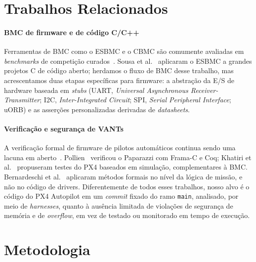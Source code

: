 \documentclass[conference]{IEEEtran}
\begin{document}
\section{Trabalhos Relacionados}
\label{sec:related}

\paragraph{BMC de firmware e de código C/C++}
Ferramentas de BMC como o ESBMC e o CBMC são comumente avaliadas em
\textit{benchmarks} de competição curados~\cite{Beyer2022}.
Sousa et al.~\cite{Sousa2026} aplicaram o ESBMC a grandes projetos C
de código aberto; herdamos o fluxo de BMC desse trabalho, mas
acrescentamos duas etapas específicas para firmware: a abstração da
E/S de hardware baseada em \textit{stubs} (UART, \textit{Universal
Asynchronous Receiver-Transmitter}; I2C, \textit{Inter-Integrated
Circuit}; SPI, \textit{Serial Peripheral Interface}; uORB) e as
asserções personalizadas derivadas de \textit{datasheets}.

\paragraph{Verificação e segurança de VANTs}
A verificação formal de firmware de pilotos automáticos continua
sendo uma lacuna em aberto~\cite{Luckcuck2019}.
Pollien~\cite{Pollien2023} verificou o Paparazzi com Frama-C e Coq;
Khatiri et al.~\cite{Khatiri2024} propuseram testes do PX4 baseados
em simulação, complementares à BMC.
Bernardeschi et al.~\cite{Bernardeschi2023} aplicaram métodos formais
no nível da lógica de missão, e não no código de drivers.
Diferentemente de todos esses trabalhos, nosso alvo é o código do
PX4 Autopilot em um \textit{commit} fixado do ramo \texttt{main},
analisado, por meio de \textit{harnesses}, quanto à ausência limitada
de violações de segurança de memória e de \textit{overflow}, em vez
de testado ou monitorado em tempo de execução.

\section{Metodologia}
\label{sec:methodology}
\end{document}
